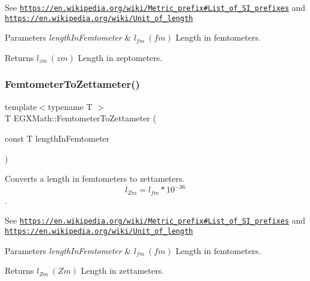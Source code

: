 See \href{https://en.wikipedia.org/wiki/Metric_prefix#List_of_SI_prefixes}{\tt https\+://en.\+wikipedia.\+org/wiki/\+Metric\+\_\+prefix\#\+List\+\_\+of\+\_\+\+S\+I\+\_\+prefixes} and \href{https://en.wikipedia.org/wiki/Unit_of_length}{\tt https\+://en.\+wikipedia.\+org/wiki/\+Unit\+\_\+of\+\_\+length} 
\begin{DoxyParams}{Parameters}
{\em length\+In\+Femtometer} & $ l_{fm}\ (fm)$ Length in femtometers. \\
\hline
\end{DoxyParams}
\begin{DoxyReturn}{Returns}
$ l_{zm}\ (zm)$ Length in zeptometers. 
\end{DoxyReturn}
\mbox{\label{group___e_g_x_math-_conversions-_length_conversions-_s_i-_femtometer-_s_i_ga4906b22484dc1005dd962a943a967b50}} 
\subsubsection{\texorpdfstring{Femtometer\+To\+Zettameter()}{FemtometerToZettameter()}}
{\footnotesize\ttfamily template$<$typename T $>$ \\
T E\+G\+X\+Math\+::\+Femtometer\+To\+Zettameter (\begin{DoxyParamCaption}\item[{const T}]{length\+In\+Femtometer }\end{DoxyParamCaption})}



Converts a length in femtometers to zettameters. \[ l_{Zm}=l_{fm} * 10^{-36} \]. 

See \href{https://en.wikipedia.org/wiki/Metric_prefix#List_of_SI_prefixes}{\tt https\+://en.\+wikipedia.\+org/wiki/\+Metric\+\_\+prefix\#\+List\+\_\+of\+\_\+\+S\+I\+\_\+prefixes} and \href{https://en.wikipedia.org/wiki/Unit_of_length}{\tt https\+://en.\+wikipedia.\+org/wiki/\+Unit\+\_\+of\+\_\+length} 
\begin{DoxyParams}{Parameters}
{\em length\+In\+Femtometer} & $ l_{fm}\ (fm)$ Length in femtometers. \\
\hline
\end{DoxyParams}
\begin{DoxyReturn}{Returns}
$ l_{Zm}\ (Zm)$ Length in zettameters. 
\end{DoxyReturn}

